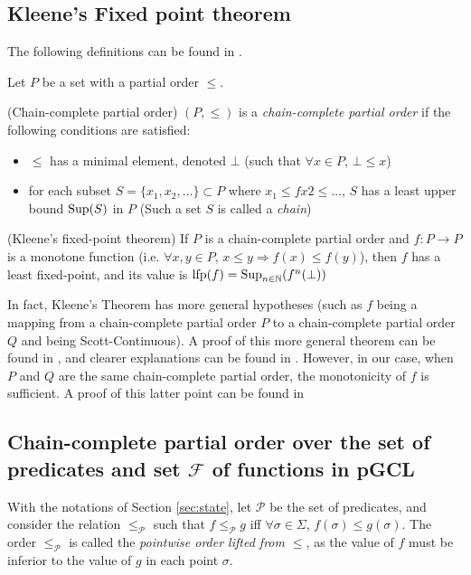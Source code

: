 \documentclass[a4paper,10pt]{llncs}
\def\NN {{\mathbb N}}
\def\Sup {\textnormal {Sup}}
\begin{document}
\subsection{Kleene's Fixed point theorem}
\label{subsec:kleene}

The following definitions can be found in \cite{Gierz80}.

Let $P$ be a set with a partial order $\leq$.
\begin{definition}{\textnormal{(Chain-complete partial order)}}
$(P,\leq)$ is a \emph{chain-complete partial order} if the following conditions are satisfied:
\begin{itemize}
\item $\leq$ has a minimal element, denoted $\bot$ (such that $\forall x \in P$, $\bot \leq x$)
\item for each subset $S = \{x_1, x_2, \dots \} \subset P$ where $x_1 \leq fx2 \leq \dots $, $S$ has a least upper bound $\Sup(S)$ in $P$ (Such a set $S$ is called a \emph{chain})
\end{itemize}
\end{definition}

\begin{theorem}{\textnormal{(Kleene's fixed-point theorem)}}
If $P$ is a chain-complete partial order and $f : P \rightarrow P$ is a monotone function (i.e. $\forall x,y \in P$, $x \leq y \Rightarrow f(x) \leq f(y)$), then $f$ has a least fixed-point, and its value is $\textnormal{lfp}(f) = \Sup_{n \in \NN}(f^n(\bot))$
\end{theorem} 

In fact, Kleene's Theorem has more general hypotheses (such as $f$ being a mapping from a chain-complete partial order $P$ to a chain-complete partial order $Q$ and being Scott-Continuous). A proof of this more general theorem can be found in \cite{Stoltenberg94}, and clearer explanations can be found in \cite{Moons13}. However, in our case, when $P$ and $Q$ are the same chain-complete partial order, the monotonicity of $f$ is sufficient. A proof of this latter point can be found in \cite{Loeckx87}


\subsection{Chain-complete partial order over the set of predicates and set $\mathcal{F}$ of functions in pGCL}
\label{subsec:predicates_cpo}

With the notations of Section \ref{sec:state}, let $\mathcal{P}$ be the set of predicates, and consider the relation $\leq_{\mathcal{P}}$ such that $f \leq_{\mathcal{P}} g$ iff $\forall \sigma \in \Sigma$, $f(\sigma) \leq g(\sigma)$. The order $\leq_{\mathcal{P}}$ is called the \emph{pointwise order lifted from $\leq$}, as the value of $f$ must be inferior to the value of $g$ in each point $\sigma$.\bigskip
\end{document}
